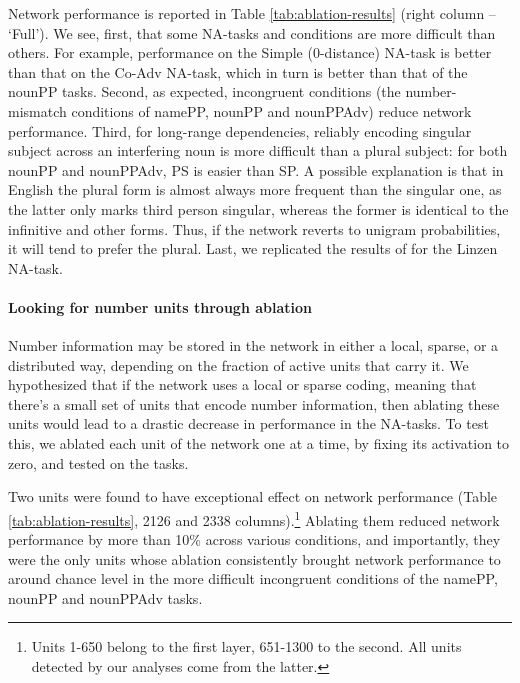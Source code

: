 Network performance is reported in Table \ref{tab:ablation-results}
(right column -- `Full'). We see, first, that some NA-tasks and
conditions are more difficult than others. For example, performance on
the Simple (0-distance) NA-task is better than that on the Co-Adv
NA-task, which in turn is better than that of the nounPP
tasks. Second, as expected, incongruent conditions (the
number-mismatch conditions of namePP, nounPP and nounPPAdv) reduce
network performance. Third, for long-range dependencies, reliably
encoding singular subject across an interfering noun is more difficult
than a plural subject: for both nounPP and nounPPAdv, PS is easier
than SP. A possible explanation is that in English the plural form is
almost always more frequent than the singular one, as the latter only
marks third person singular, whereas the former is identical to the
infinitive and other forms. Thus, if the network reverts to unigram
probabilities, it will tend to prefer the plural. Last, we replicated
the results of  for the Linzen NA-task.

\paragraph{Looking for number units through ablation} Number
information may be stored in the network in either a local, sparse, or
a distributed way, depending on the fraction of active units that
carry it.  We hypothesized that if the network uses a local or sparse
coding, meaning that there's a small set of units that encode number
information, then ablating these units would lead to a drastic
decrease in performance in the NA-tasks.  To test this, we ablated
each unit of the network one at a time, by fixing its activation to zero,
and tested on the tasks.

Two units were found to have exceptional effect on network performance
(Table \ref{tab:ablation-results}, \unit{2}{126} and \unit{2}{338}
columns).\footnote{Units 1-650 belong to the first layer, 651-1300 to
  the second. All units detected by our analyses come from the latter.} Ablating them reduced network performance by more than 10\%
across various conditions, and importantly, they were the only units
whose ablation consistently brought network performance to around
chance level in the more difficult incongruent conditions of the
namePP, nounPP and nounPPAdv
tasks. 

